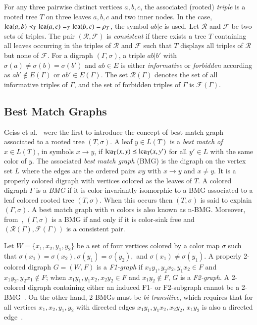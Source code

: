 \documentclass[final,3p,times]{elsarticle}
\begin{document}
For any three pairwise distinct vertices $a,b,c$, the associated (rooted) \emph{triple} is a rooted tree $T$ on three leaves $a,b,c$ and two inner nodes. In the case, ${\rm{lca}}(a,b)\prec_T {\rm{lca}}(a,c)=_T{\rm{lca}}(b,c)=\rho_T$, the symbol $ab|c$ is used. Let $\mathscr{R}$ and $\mathscr{F}$ be two sets of triples. The pair $(\mathscr{R},\mathscr{F})$ is \emph{consistent} if there exists a tree $T$ containing all leaves occurring in the triples of $\mathscr{R}$ and $\mathscr{F}$ such that $T$ displays all triples of $\mathscr{R}$ but none of $\mathscr{F}$. For a digraph $(\Gamma,\sigma)$, a triple $ab|b'$ with $\sigma(a)\ne \sigma(b)=\sigma(b')$ and $ab\in E$ is either {\emph{informative}} or {\emph{forbidden}} according as $ab'\not\in E(\Gamma)$ or $ab'\in E(\Gamma)$. The set $\mathscr{R}(\Gamma)$ denotes the set of all informative triples of $\Gamma$, and the set of forbidden triples of $\Gamma$ is $\mathscr{F}(\Gamma)$. 

\subsection{Best Match Graphs}
Geiss et al.~\cite{Geiss:19a} were the first to introduce the concept of best match graph associated to a rooted tree $(T,\sigma)$. A leaf $y\in L(T)$ is a {\emph{best match of}} $x\in L(T)$, in symbols $x\rightarrow y$, if ${\rm{lca_T}}(x,y)\preceq {\rm{lca_T}}(x,y')$ for all $y'\in L$ with the same color of $y$. The associated {\emph{best match graph}} (BMG) is the digraph on the vertex set $L$ where the edges are the ordered pairs $xy$ with $x\rightarrow y$ and  $x\neq y$. It is a properly colored digraph with vertices colored as the leaves of $T$. A colored digraph $\Gamma$ is a \emph{BMG} if it is color-invariantly isomorphic to a BMG associated to a leaf colored rooted tree $(T,\sigma)$. When this occurs then $(T,\sigma)$ is said to explain $(\Gamma,\sigma)$. A best match graph with $n$ colors is also known as n-BMG. Moreover, from~\cite[Proposition~2.3]{korchmaros2021quasi}, $(\Gamma,\sigma)$ is a BMG if and only if it is color-sink free and $(\mathscr{R}(\Gamma),\mathscr{F}(\Gamma))$ is a consistent pair. 

Let $W=\{x_1,x_2,y_1,y_2\}$ be a set of four vertices colored by a color map $\sigma$ such that $\sigma(x_1)=\sigma(x_2),\sigma(y_1)=\sigma(y_2),$ and $\sigma(x_1)\neq \sigma(y_1)$. A properly 2-colored digraph $G=(W,F)$ is a \emph{F1-graph} if $x_1y_1,y_2x_2,y_1x_2 \in F$ and $x_1 y_2,y_2x_1 \notin F$; when $x_1y_1,y_1x_2,x_2y_2 \in F$ and $x_1y_2 \notin F$, $G$ is a \emph{F2-graph}. A 2-colored digraph containing either an induced F1- or F2-subgraph cannot be a 2-BMG~\cite[Lemma 4.2]{schaller2021complexity}. On the other hand, 2-BMGs must be \emph{bi-transitive}, which requires that for all vertices $x_1, x_2, y_1, y_2$ with directed edges $x_1y_1, y_1x_2, x_2y_2$, $x_1y_2$ is also a directed edge~\cite{Korchmaros:21a}.
\end{document}
